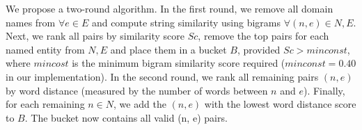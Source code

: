 We propose a two-round algorithm. In the first round, we remove all domain names from $\forall e \in E$ and compute string similarity using bigrams $\forall (n, e) \in N, E$. Next, we rank all pairs by similarity score $Sc$, remove the top pairs for each named entity from $N, E$ and place them in a bucket $B$, provided $Sc > minconst$, where $mincost$ is the minimum bigram similarity score required ($minconst = 0.40$ in our implementation). In the second round, we rank all remaining pairs $(n, e)$ by word distance (measured by the number of words between $n$ and $e$). Finally, for each remaining $n \in N$, we add the $(n, e)$ with the lowest word distance score to $B$. The bucket now contains all valid (n, e) pairs.